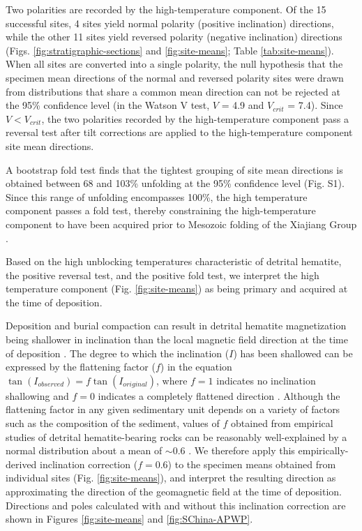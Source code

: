 Two polarities are recorded by the high-temperature component. Of the 15 successful sites, 4 sites yield normal polarity (positive inclination) directions, while the other 11 sites yield reversed polarity (negative inclination) directions (Figs. \ref{fig:stratigraphic-sections} and \ref{fig:site-means}; Table \ref{tab:site-means}). When all sites are converted into a single polarity, the null hypothesis that the specimen mean directions of the normal and reversed polarity sites were drawn from distributions that share a common mean direction can not be rejected at the 95\% confidence level (in the Watson V test, $V$ = 4.9 and $V_{crit}$ = 7.4). Since $V<V_{crit}$, the two polarities recorded by the high-temperature component pass a reversal test after tilt corrections are applied to the high-temperature component site mean directions.

A bootstrap fold test \citep{Tauxe1994a} finds that the tightest grouping of site mean directions is obtained between 68 and 103\% unfolding at the 95\% confidence level (Fig. S1). Since this range of unfolding encompasses 100\%, the high temperature component passes a fold test, thereby constraining the high-temperature component to have been acquired prior to Mesozoic folding of the Xiajiang Group \citep{Li2016c, Ma2019a}.

Based on the high unblocking temperatures characteristic of detrital hematite, the positive reversal test, and the positive fold test, we interpret the high temperature component (Fig. \ref{fig:site-means}) as being primary and acquired at the time of deposition.

Deposition and burial compaction can result in detrital hematite magnetization being shallower in inclination than the local magnetic field direction at the time of deposition \citep{Tauxe2005a, Bilardello2016a}. The degree to which the inclination ($I$) has been shallowed can be expressed by the flattening factor ($f$) in the equation $\tan(I_{observed}) = f\tan(I_{original})$, where $f=1$ indicates no inclination shallowing and $f=0$ indicates a completely flattened direction \citep{King1955a}. Although the flattening factor in any given sedimentary unit depends on a variety of factors such as the composition of the sediment, values of $f$ obtained from empirical studies of detrital hematite-bearing rocks can be reasonably well-explained by a normal distribution about a mean of $\sim$0.6 \citep{Tauxe1984a, Bilardello2016a}. We therefore apply this empirically-derived inclination correction ($f=0.6$) to the specimen means obtained from individual sites (Fig. \ref{fig:site-means}), and interpret the resulting direction as approximating the direction of the geomagnetic field at the time of deposition. Directions and poles calculated with and without this inclination correction are shown in Figures \ref{fig:site-means} and \ref{fig:SChina-APWP}.

